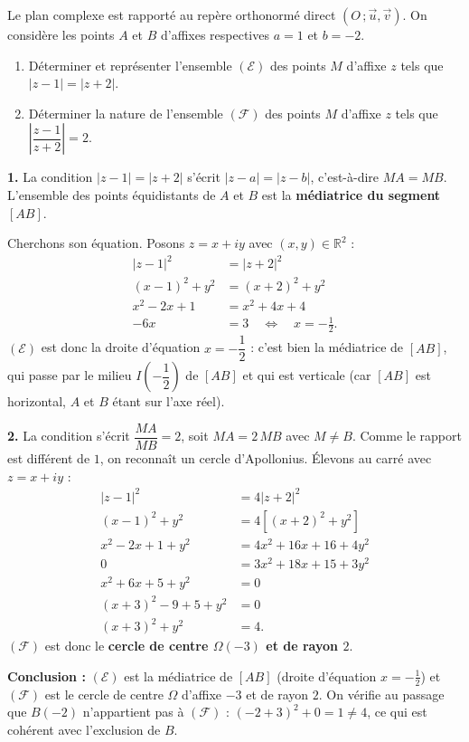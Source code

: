 \documentclass[11pt]{article}
\begin{document}
\begin{exoresolu}
Le plan complexe est rapporté au repère orthonormé direct $(O\,;\vec{u},\vec{v})$. On considère les points $A$ et $B$ d'affixes respectives $a=1$ et $b=-2$.
\begin{enumerate}
\item Déterminer et représenter l'ensemble $(\mathcal{E})$ des points $M$ d'affixe $z$ tels que $|z-1|=|z+2|$.
\item Déterminer la nature de l'ensemble $(\mathcal{F})$ des points $M$ d'affixe $z$ tels que $\left|\dfrac{z-1}{z+2}\right|=2$.
\end{enumerate}
\tcblower
\textbf{1.} La condition $|z-1|=|z+2|$ s'écrit $|z-a|=|z-b|$, c'est-à-dire $MA=MB$. L'ensemble des points équidistants de $A$ et $B$ est la \textbf{médiatrice du segment $[AB]$}.

Cherchons son équation. Posons $z=x+iy$ avec $(x,y)\in\mathbb{R}^2$ :
\begin{align*}
|z-1|^2 &= |z+2|^2\\
(x-1)^2+y^2 &= (x+2)^2+y^2\\
x^2-2x+1 &= x^2+4x+4\\
-6x &= 3 \quad\Longleftrightarrow\quad x=-\tfrac{1}{2}.
\end{align*}
$(\mathcal{E})$ est donc la droite d'équation $x=-\dfrac{1}{2}$ : c'est bien la médiatrice de $[AB]$, qui passe par le milieu $I\left(-\dfrac{1}{2}\right)$ de $[AB]$ et qui est verticale (car $[AB]$ est horizontal, $A$ et $B$ étant sur l'axe réel).

\textbf{2.} La condition s'écrit $\dfrac{MA}{MB}=2$, soit $MA=2\,MB$ avec $M\neq B$. Comme le rapport est différent de $1$, on reconnaît un cercle d'Apollonius. Élevons au carré avec $z=x+iy$ :
\begin{align*}
|z-1|^2 &= 4|z+2|^2\\
(x-1)^2+y^2 &= 4\left[(x+2)^2+y^2\right]\\
x^2-2x+1+y^2 &= 4x^2+16x+16+4y^2\\
0 &= 3x^2+18x+15+3y^2\\
x^2+6x+5+y^2 &= 0\\
(x+3)^2-9+5+y^2 &= 0\\
(x+3)^2+y^2 &= 4.
\end{align*}
$(\mathcal{F})$ est donc le \textbf{cercle de centre $\Omega(-3)$ et de rayon $2$}.

\textbf{Conclusion :} $(\mathcal{E})$ est la médiatrice de $[AB]$ (droite d'équation $x=-\tfrac12$) et $(\mathcal{F})$ est le cercle de centre $\Omega$ d'affixe $-3$ et de rayon $2$. On vérifie au passage que $B(-2)$ n'appartient pas à $(\mathcal{F})$ : $(-2+3)^2+0=1\neq 4$, ce qui est cohérent avec l'exclusion de $B$.
\end{exoresolu}
\end{document}
